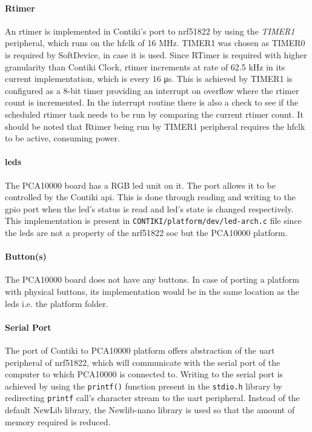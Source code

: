 \paragraph{Rtimer}
An rtimer is implemented in Contiki's port to nrf51822 by using the \emph{TIMER1} peripheral, which runs on the \gls{hfclk} of 16 MHz. TIMER1 was chosen as TIMER0 is required by SoftDevice, in case it is used. Since RTimer is required with higher granularity than Contiki Clock, rtimer increments at rate of 62.5 kHz in its current implementation, which is every 16 \si{\micro \second}. This is achieved by TIMER1 is configured as a 8-bit timer providing an interrupt on overflow where the rtimer count is incremented. In the interrupt routine there is also a check to see if the scheduled rtimer task needs to be run by comparing the current rtimer count. It should be noted that Rtimer being run by TIMER1 peripheral requires the \gls{hfclk} to be active, consuming power.

\paragraph{\glspl{led}}
The PCA10000 board has a RGB \gls{led} unit on it. The port allows it to be controlled by the Contiki \gls{api}. This is done through reading and writing to the \gls{gpio} port when the \gls{led}'s status is read and \gls{led}'s state is changed respectively. This implementation is present in \texttt{CONTIKI/platform/dev/led-arch.c} file since the \glspl{led} are not a property of the nrf51822 \gls{soc} but the PCA10000 platform.

\paragraph{Button(s)}
The PCA10000 board does not have any buttons. In case of porting a platform with physical buttons, its implementation would be in the same location as the \glspl{led} i.e. the platform folder.

\paragraph{Serial Port}
The port of Contiki to PCA10000 platform offers abstraction of the \gls{uart} peripheral of nrf51822, which will communicate with the serial port of the computer to which PCA10000 is connected to. Writing to the serial port is achieved by using the \texttt{printf()} function present in the \texttt{stdio.h} library by redirecting \texttt{printf} call's character stream to the \gls{uart} peripheral. Instead of the default NewLib library, the Newlib-nano library is used so that the amount of memory required is reduced.

